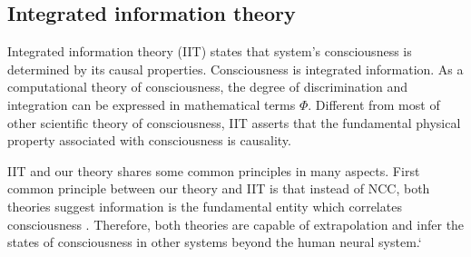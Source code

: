 \documentclass[utf8]{article}
\begin{document}
		\subsection{Integrated information theory}
		Integrated information theory (IIT) states that system's consciousness is determined by its causal properties. Consciousness is integrated information. As a computational theory of consciousness, the degree of discrimination and integration can be expressed in mathematical terms $\Phi$. Different from most of other scientific theory of consciousness, IIT asserts that the fundamental physical property associated with consciousness is causality.
		
		IIT and our theory shares some common principles in many aspects. First common principle between our theory and IIT is that instead of NCC, both theories suggest information is the fundamental entity which correlates consciousness . Therefore, both theories are capable of extrapolation and infer the states of consciousness in other systems beyond the human neural system.`
		
		
		
\end{document}
